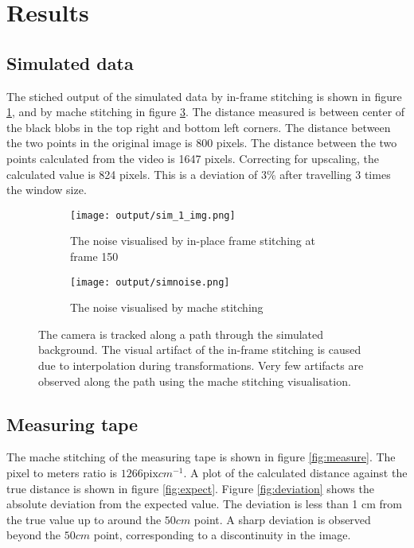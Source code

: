 \section{Results}

\subsection{Simulated data}

The stiched output of the simulated data by in-frame stitching is shown in figure \ref{fig:simnoise_a},
and by mache stitching in figure \ref{fig:simnoise}.
The distance measured is between center of the black blobs in the top right and bottom left corners.
The distance between the two points in the original image is 800 pixels.
The distance between the two points calculated from the video is 1647 pixels.
Correcting for upscaling, the calculated value is 824 pixels.
This is a deviation of 3\% after travelling 3 times the window size.

\begin{figure}
  \begin{subfigure}[b]{0.45\textwidth}
    \texttt{[image: output/sim\_1\_img.png]}
    \caption{The noise visualised by in-place frame stitching at frame 150}
    \label{fig:simnoise_a}
  \end{subfigure}
  \begin{subfigure}[b]{0.45\textwidth}
    \texttt{[image: output/simnoise.png]}
    \caption{The noise visualised by mache stitching}
    \label{fig:simnoise}
  \end{subfigure}
  \caption{The camera is tracked along a path through the simulated background.
  The visual artifact of the in-frame stitching is caused due to interpolation during transformations.
  Very few artifacts are observed along the path using the mache stitching visualisation.}
\end{figure}

\subsection{Measuring tape}

The mache stitching of the measuring tape is shown in figure \ref{fig:measure}.
The pixel to meters ratio is $1266 \text{pix} cm^{-1}$.
A plot of the calculated distance against the true distance is shown in figure \ref{fig:expect}.
Figure \ref{fig:deviation} shows the absolute deviation from the expected value.
The deviation is less than 1 cm from the true value up to around the $50 cm$ point.
A sharp deviation is observed beyond the $50 cm$ point,
corresponding to a discontinuity in the image.

